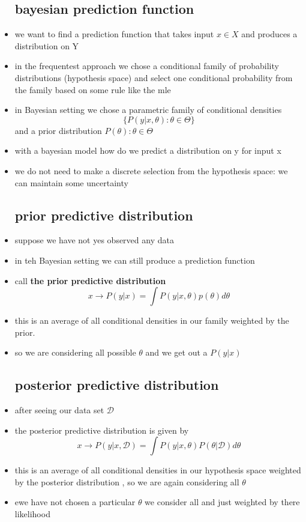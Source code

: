 \documentclass{article}
\begin{document}
\begin{itemize}
\subsection*{bayesian prediction function}

\item we want to find a prediction function that takes input $x\in X$ and produces a distribution on Y
\item in the frequentest approach we chose a conditional family of probability distributions (hypothesis space) and select one conditional probability from the family based on some rule like the mle
\item in Bayesian setting we chose a parametric family of conditional densities $$\{P(y|x,\theta):\theta\in \Theta\}$$ and a prior distribution $P(\theta):\theta\in \Theta$
\item with a bayesian model how do we predict a distribution on y for input x 
\item we do not need to make a discrete selection from the hypothesis space: we can maintain some uncertainty
\subsection*{prior predictive distribution}
\item suppose we have not yes observed any data 
\item in teh Bayesian setting we can still produce a prediction function 
\item call \textbf{the prior predictive distribution} $$x\rightarrow P(y|x)=\int P(y|x,\theta)p(\theta)d\theta$$ 

\item this is an average of all conditional densities in our family weighted by the prior. 
\item so we are considering all possible $\theta$ and we get out a $P(y|x)$
\subsection*{posterior predictive distribution}
\item after seeing our data set $\mathcal{D}$
\item the posterior predictive distribution is given by  $$x\rightarrow P(y|x,\mathcal{D})=\int P(y|x,\theta)P(\theta|\mathcal{D})d\theta$$
\item this is an average of all conditional densities in our hypothesis space weighted by the posterior distribution , so we are again considering all $\theta$
\item ewe have not chosen a particular $\theta$ we consider all and just weighted by there likelihood

\end{itemize}
\end{document}
